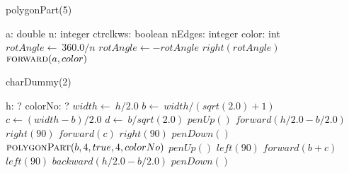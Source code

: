 \documentclass[a4paper,10pt]{article}
\begin{document}
\begin{algorithm}
\caption{polygonPart(5)}
\begin{algorithmic}[5]
\State {}
\State {}
    \State a: double
    \State n: integer
    \State ctrclkws: boolean
    \State nEdges: integer
    \State color: int
  \EndDecl
  \State \(rotAngle\gets\ 360.0/n\)
    \State \(rotAngle\gets-rotAngle\)
  \EndIf
    \State \(right(rotAngle)\)
    \State \(\Call{forward}{a,color}\)
  \EndFor
\EndProcedure
\end{algorithmic}
\end{algorithm}


\begin{algorithm}
\caption{charDummy(2)}
\begin{algorithmic}[5]
\State {}
\State {}
    \State h: ?
    \State colorNo: ?
  \EndDecl
  \State \(width\gets\ h/2.0\)
  \State \(b\gets\ width/(sqrt(2.0)+1)\)
  \State \(c\gets(width-b)/2.0\)
  \State \(d\gets\ b/sqrt(2.0)\)
  \State \(penUp()\)
  \State \(forward(h/2.0-b/2.0)\)
  \State \(right(90)\)
  \State \(forward(c)\)
  \State \(right(90)\)
  \State \(penDown()\)
  \State \(\Call{polygonPart}{b,4,true,4,colorNo}\)
  \State \(penUp()\)
  \State \(left(90)\)
  \State \(forward(b+c)\)
  \State \(left(90)\)
  \State \(backward(h/2.0-b/2.0)\)
  \State \(penDown()\)
\EndProcedure
\end{algorithmic}
\end{algorithm}
\end{document}

